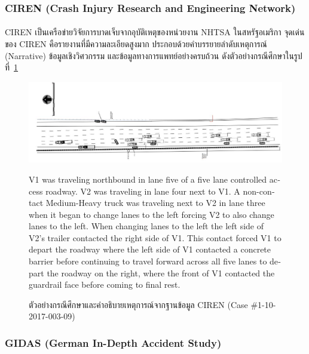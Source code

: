 \subsubsection{CIREN (Crash Injury Research and Engineering Network)}
\paragraph{}
CIREN เป็นเครือข่ายวิจัยการบาดเจ็บจากอุบัติเหตุของหน่วยงาน NHTSA ในสหรัฐอเมริกา \cite{nhtsa_ciren} จุดเด่นของ CIREN คือรายงานที่มีความละเอียดสูงมาก ประกอบด้วยคำบรรยายลำดับเหตุการณ์ (Narrative) ข้อมูลเชิงวิศวกรรม และข้อมูลทางการแพทย์อย่างครบถ้วน ดังตัวอย่างกรณีศึกษาในรูปที่~\ref{fig:ciren_example}

\begin{figure}[h!]
    \centering
    \begin{minipage}{0.48\textwidth}
        \includegraphics[width=\linewidth]{images/ciren-case-example}
    \end{minipage}\hfill
    \begin{minipage}{0.48\textwidth}
        \footnotesize
        \textenglish{V1 was traveling northbound in lane five of a five lane controlled access roadway. V2 was traveling in lane four next to V1. A non-contact Medium-Heavy truck was traveling next to V2 in lane three when it began to change lanes to the left forcing V2 to also change lanes to the left. When changing lanes to the left the left side of V2's trailer contacted the right side of V1. This contact forced V1 to depart the roadway where the left side of V1 contacted a concrete barrier before continuing to travel forward across all five lanes to depart the roadway on the right, where the front of V1 contacted the guardrail face before coming to final rest.}
    \end{minipage}
    \caption{ตัวอย่างกรณีศึกษาและคำอธิบายเหตุการณ์จากฐานข้อมูล CIREN (Case \#1-10-2017-003-09)}
    \label{fig:ciren_example}
\end{figure}

\subsubsection{GIDAS (German In-Depth Accident Study)}
